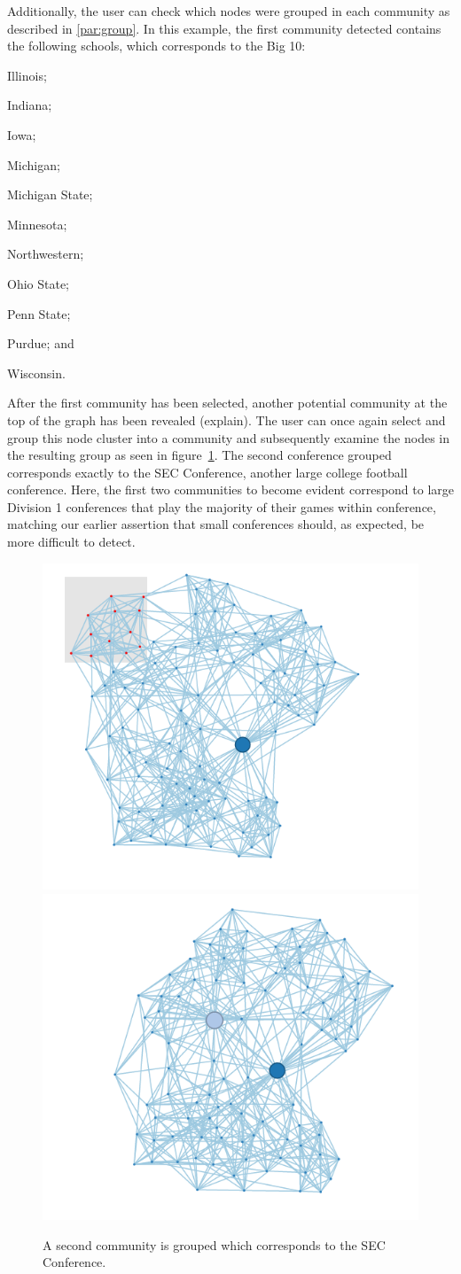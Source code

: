 \documentclass{article}\usepackage[]{graphicx}\usepackage[]{color}
\newcommand{\ak}[1]{{\color{blue} #1}}
\begin{document}
Additionally, the user can check which nodes were grouped in each community as described in \ref{par:group}. In this example, the first community detected contains the following schools, which corresponds to the Big 10:\begin{inparaenum}
\item Illinois;
\item Indiana; 
\item Iowa; 
\item Michigan; 
\item Michigan State; 
\item Minnesota; 
\item Northwestern; 
\item Ohio State; 
\item Penn State;
\item Purdue; and
\item Wisconsin.
\end{inparaenum}

After the first community has been selected, another potential community at the top of the graph has been revealed \ak{(explain)}. The user can once again select and group this node cluster into a community and subsequently examine the nodes in the resulting group as seen in figure~\ref{fig:football_6}. The second conference grouped corresponds exactly to the SEC Conference, another large college football conference. Here, the first two communities to become evident correspond to large Division 1 conferences that play the majority of their games within conference, matching our earlier assertion that small conferences should, as expected, be more difficult to detect.

\begin{figure}[H]
\centering
\includegraphics[width=.49\textwidth]{images/football_45.png}
\includegraphics[width=.49\textwidth]{images/football_6.png}
\caption{\label{fig:football_6} A second community is grouped which corresponds to the SEC Conference.}
\end{figure}
\end{document}
